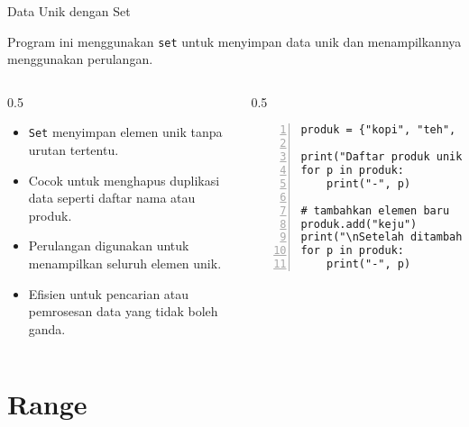 \documentclass[aspectratio=169, table]{beamer}
\begin{document}
\begin{frame}[fragile]{Data Unik dengan Set}
\vspace{20pt}

Program ini menggunakan \texttt{set} untuk menyimpan data unik dan menampilkannya menggunakan perulangan.

\begin{columns}[T]
  \begin{column}{0.5\textwidth}
    \begin{itemize}
      \item \texttt{Set} menyimpan elemen unik tanpa urutan tertentu.
      \item Cocok untuk menghapus duplikasi data seperti daftar nama atau produk.
      \item Perulangan digunakan untuk menampilkan seluruh elemen unik.
      \item Efisien untuk pencarian atau pemrosesan data yang tidak boleh ganda.
    \end{itemize}
  \end{column}

  \begin{column}{0.5\textwidth}
    \begin{lstlisting}[style=PythonStyle, numbers=left, firstnumber=1]
produk = {"kopi", "teh", "gula", "kopi", "susu"}

print("Daftar produk unik:")
for p in produk:
    print("-", p)

# tambahkan elemen baru
produk.add("keju")
print("\nSetelah ditambah:")
for p in produk:
    print("-", p)
    \end{lstlisting}
  \end{column}
\end{columns}

\end{frame}


\section{Range}
\end{document}
